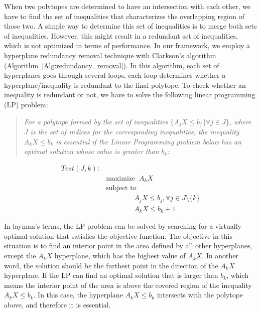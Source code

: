 \documentclass[lettersize,journal]{IEEEtran}
\begin{document}
When two polytopes are determined to have an intersection with each other, we have to find the set of inequalities that characterizes the overlapping region of those two. A simple way to determine this set of inequalities is to merge both sets of inequalities. However, this might result in a redundant set of inequalities, which is not optimized in terms of performance. In our framework, we employ a hyperplane redundancy removal technique with Clarkson\textquoteright s algorithm~\cite{clarkson1994more} (Algorithm~\ref{Alg:redundancy_removal}). In this algorithm, each set of hyperplanes goes through several loops, each loop determines whether a hyperplane/inequality is redundant to the final polytope. To check whether an inequality is redundant or not, we have to solve the following linear programming (LP) problem:

\begin{quote}
\textit{For a polytope formed by the set of inequalities $\{A_jX \leq b_j\ |\forall j \in J\}$, where $J$ is the set of indices for the corresponding inequalities, the inequality $A_kX \leq b_k$ is essential if the Linear Programming problem below has an optimal solution whose value is greater than $b_k$:}
\end{quote}

\vspace{-0.5cm}
\begin{align}
Test(J,k): \nonumber \\
& \mbox{maximize} \;\; A_k X \nonumber \\
& \mbox{subject to} \nonumber \\
& \qquad \qquad A_j X \leq b_j, \forall j \in J \setminus \{k\} \nonumber\\
& \qquad \qquad A_k X \leq b_k + 1 \nonumber
\end{align}

In layman\textquoteright s terms, the LP problem can be solved by searching for a virtually optimal solution that satisfies the objective function. The objective in this situation is to find an interior point in the area defined by all other hyperplanes, except the $A_k X$ hyperplane, which has the highest value of $A_k X$. In another word, the solution should be the furthest point in the direction of the $A_k X$ hyperplane. If the LP can find an optimal solution that is larger than $b_k$, which means the interior point of the area is above the covered region of the inequality $A_k X \leq b_k$. In this case, the hyperplane $A_k X \leq b_k$ intersects with the polytope above, and therefore it is essential.
\end{document}
